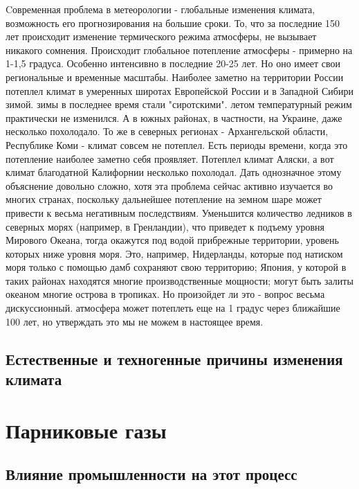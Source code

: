 \documentclass[a5paper,10pt]{article}
\begin{document}
 		Cовременная проблема в метеорологии - глобальные изменения климата, возможность его прогнозирования на большие сроки. То, что за последние 150 лет происходит изменение термического режима атмосферы, не вызывает никакого сомнения. Происходит глобальное потепление атмосферы - примерно на 1-1,5 градуса. Особенно интенсивно в последние 20-25 лет. Но оно имеет свои региональные и временные масштабы. Наиболее заметно на территории России потеплел климат в умеренных широтах Европейской России и в Западной Сибири зимой. зимы в последнее время стали "сиротскими". летом температурный режим практически не изменился. А в южных районах, в частности, на Украине, даже несколько похолодало. То же в северных регионах - Архангельской области, Республике Коми - климат совсем не потеплел. Есть периоды времени, когда это потепление наиболее заметно себя проявляет. Потеплел климат Аляски, а вот климат благодатной Калифорнии несколько похолодал. Дать однозначное этому объяснение довольно сложно, хотя эта проблема сейчас активно изучается во многих странах, поскольку дальнейшее потепление на земном шаре может привести к весьма негативным последствиям. Уменьшится количество ледников в северных морях (например, в Гренландии), что приведет к подъему уровня Мирового Океана, тогда окажутся под водой прибрежные территории, уровень которых ниже уровня моря. Это, например, Нидерланды, которые под натиском моря только с помощью дамб сохраняют свою территорию; Япония, у которой в таких районах находятся многие производственные мощности; могут быть залиты океаном многие острова в тропиках. Но произойдет ли это - вопрос весьма дискуссионный. атмосфера может потеплеть еще на 1 градус через ближайшие 100 лет, но утверждать это мы не можем в настоящее время.\cite{meteonovosti}

		\subsection{Естественные и техногенные причины изменения климата}

		\newpage

	\section{Парниковые газы}
		\subsection{Влияние промышленности на этот процесс}
\end{document}
